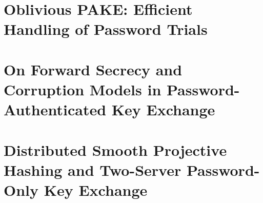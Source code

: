 \chapter{Oblivious PAKE: Efficient Handling of Password Trials}\label{paper:opake}


\chapter{On Forward Secrecy and Corruption Models in Password-Authenticated Key Exchange}\label{paper:corrupt}


\chapter{Distributed Smooth Projective Hashing and Two-Server Password-Only Key Exchange}\label{paper:2pake}
